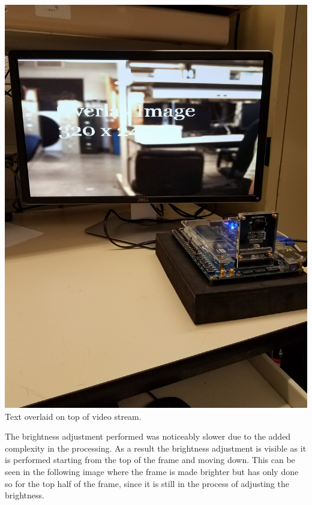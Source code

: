 \documentclass{article}
\newenvironment{Figure}
  {\par\medskip\noindent\ignorespaces\minipage{\linewidth}}
  {\endminipage\par\medskip}
\begin{document}
\begin{multicols*}{2}
\begin{Figure}
 \centering
 \includegraphics[width=\linewidth]{overlay_image.jpg}
 {Text overlaid on top of video stream.}
\end{Figure}

The brightness adjustment performed was noticeably slower due to the added complexity in the processing. As a result the brightness adjustment is visible as it is performed starting from the top of the frame and moving down. This can be seen in the following image where the frame is made brighter but has only done so for the top half of the frame, since it is still in the process of adjusting the brightness.


\end{multicols*}
\end{document}
